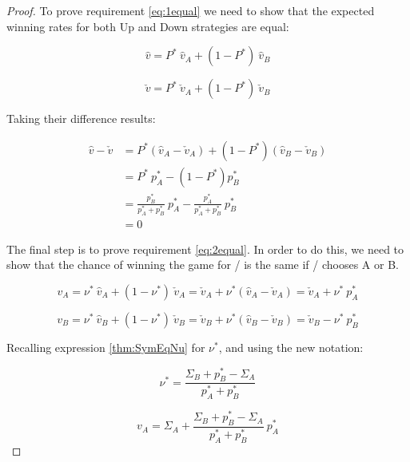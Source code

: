 \documentclass{article}
\theoremstyle{definition}
\begin{document}
\begin{proof}
To prove requirement \eqref{eq:1equal} we need to show that the expected winning rates for both Up and Down strategies are equal:

\begin{equation}
    \hat{v} = P^* \ \hat{v}_A + (1-P^*) \ \hat{v}_B
\end{equation}

\begin{equation}
    \check{v} = P^* \ \check{v}_A + (1-P^*) \ \check{v}_B
\end{equation}

Taking their difference results:

\begin{equation}
    \begin{split}
        \hat{v} - \check{v} &= P^* (\hat{v}_A - \check{v}_A) + (1-P^*) (\hat{v}_B - \check{v}_B) \\
                            &= P^* \ p^*_A - (1-P^*) p^*_B \\
                            &= \frac{p^*_B}{p^*_A+p^*_B} \ p^*_A - \frac{p^*_A}{p^*_A+p^*_B} \ p^*_B \\
                            & = 0
    \end{split}  
\end{equation}

The final step is to prove requirement \eqref{eq:2equal}. In order to do this, we need to show that the chance of winning the game for \PI/ is the same if \PII/ chooses A or B.


\begin{equation}
\label{eq:vAnu}
    v_A = \nu^* \ \hat{v}_A + (1-\nu^*) \ \check{v}_A = \check{v}_A + \nu^* (\hat{v}_A - \check{v}_A) = \check{v}_A + \nu^* \ p^*_A
\end{equation}

\begin{equation}
\label{eq:vBnu}
    v_B = \nu^* \ \hat{v}_B + (1-\nu^*) \ \check{v}_B = \check{v}_B + \nu^* (\hat{v}_B - \check{v}_B) = \check{v}_B - \nu^* \ p^*_B
\end{equation}


Recalling expression \ref{thm:SymEqNu} for $\nu^*$, and using the new notation:

\begin{equation}
    \nu^* = \frac{\Sigma_B + p^*_B - \Sigma_A}{p^*_A + p^*_B}
\end{equation}

\begin{equation}
    v_A = \Sigma_A + \frac{\Sigma_B + p^*_B - \Sigma_A}{p^*_A + p^*_B} \ p^*_A
\end{equation}


\end{proof}
\end{document}
